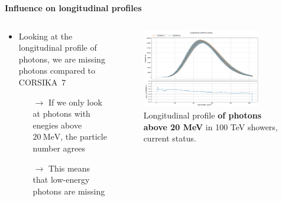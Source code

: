 \documentclass[aspectratio=1610, 9pt]{beamer}
\begin{document}
\begin{frame}
  \textbf{Influence on longitudinal profiles}
  \vspace{5mm}
    \begin{columns}[onlytextwidth]
        \begin{column}{0.4\textwidth}
            \begin{itemize}
              \item Looking at the longitudinal profile of photons, we are missing photons compared to CORSIKA~7
              \begin{itemize}
                \item[$\rightarrow$] If we only look at photons with enegies above $\SI{20}{\mega\electronvolt}$, the particle number agrees
                \item[$\rightarrow$] This means that low-energy photons are missing
              \end{itemize}
            \end{itemize}
        \end{column}
        \begin{column}{0.6\textwidth}
            \begin{figure}
                \centering
                \includegraphics[width=0.85\textwidth]{plots/long_photon_2023_cherenkov.png}
                \caption{Longitudinal profile \textbf{of photons above 20 MeV} in 100 \si{\tera\electronvolt} showers, current status.}
            \end{figure}
        \end{column}
    \end{columns}
\end{frame}
\end{document}
